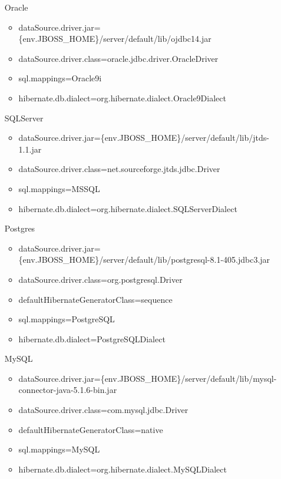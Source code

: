 \begin{itemize}
	\item [Oracle] \hfill
	\begin{itemize}
		\item dataSource.driver.jar=\textdollar{}\{env.JBOSS\_HOME\}/server/default/lib/ojdbc14.jar
		\item dataSource.driver.class=oracle.jdbc.driver.OracleDriver
		\item sql.mappings=Oracle9i
		\item hibernate.db.dialect=org.hibernate.dialect.Oracle9Dialect
	\end{itemize}
	\item [SQLServer] \hfill
	\begin{itemize}
		\item dataSource.driver.jar=\textdollar{}\{env.JBOSS\_HOME\}/server/default/lib/jtds-1.1.jar
		\item dataSource.driver.class=net.sourceforge.jtds.jdbc.Driver
		\item sql.mappings=MSSQL
		\item hibernate.db.dialect=org.hibernate.dialect.SQLServerDialect
	\end{itemize} 
	\item [Postgres] \hfill
	\begin{itemize}
		\item dataSource.driver.jar=\textdollar{}\{env.JBOSS\_HOME\}/server/default/lib/postgresql-8.1-405.jdbc3.jar
		\item dataSource.driver.class=org.postgresql.Driver
		\item defaultHibernateGeneratorClass=sequence
		\item sql.mappings=PostgreSQL
		\item hibernate.db.dialect=PostgreSQLDialect
	\end{itemize}
	\item [MySQL] \hfill
	\begin{itemize}
		\item dataSource.driver.jar=\textdollar{}\{env.JBOSS\_HOME\}/server/default/lib/mysql-connector-java-5.1.6-bin.jar
		\item dataSource.driver.class=com.mysql.jdbc.Driver
		\item defaultHibernateGeneratorClass=native
		\item sql.mappings=MySQL
		\item hibernate.db.dialect=org.hibernate.dialect.MySQLDialect
	\end{itemize}
\end{itemize}

